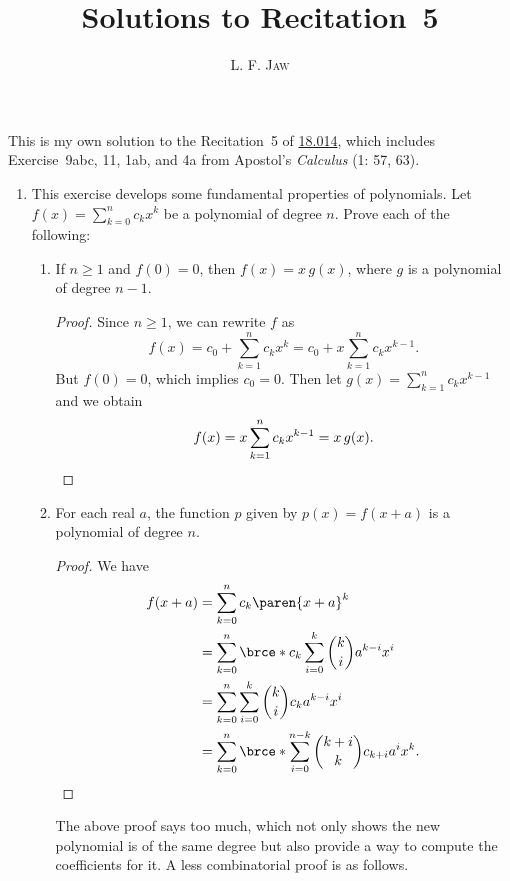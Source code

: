 \documentclass[a4paper]{article}
\title{Solutions to Recitation~5}
\author{L. F. \textsc{Jaw}}
\begin{document}
\maketitle

This is my own solution to the Recitation~5 of
\href{https://ocw.mit.edu/courses/mathematics/18-014-calculus-with-theory-fall-2010/recitations/}{18.014},
which includes Exercise~9abc, 11, 1ab, and 4a from Apostol's
\textit{Calculus} (1: 57, 63).

\begin{enumerate}
\item This exercise develops some fundamental properties of
  polynomials.  Let \(f(x) = \sum_{k=0}^n c_k x^k\) be a polynomial of
  degree \(n\).  Prove each of the following:
  \begin{enumerate}
  \item If \(n \ge 1\) and \(f(0) = 0\), then \(f(x) = x \, g(x)\), where
    \(g\) is a polynomial of degree \(n-1\).

    \begin{proof}
      Since \(n \ge 1\), we can rewrite \(f\) as
      \begin{displaymath}
        f(x) = c_0 + \sum_{k=1}^n c_k x^k = c_0 + x \sum_{k=1}^n c_k x^{k-1}.
      \end{displaymath}
      But \(f(0) = 0\), which implies \(c_0 = 0\).  Then let
      \(g(x) = \sum_{k=1}^n c_k x^{k-1}\) and we obtain
      \begin{displaymath}
        f(x) = x \sum_{k=1}^n c_k x^{k-1} = x \, g(x). \qedhere
      \end{displaymath}
    \end{proof}

  \item For each real \(a\), the function \(p\) given by
    \(p(x) = f(x+a)\) is a polynomial of degree \(n\).

    \begin{proof}
      We have
      \begin{align*}
        f(x+a) &= \sum_{k=0}^n c_k \paren{x+a}^k \\
               &= \sum_{k=0}^n \brce*{ c_k \sum_{i=0}^k \binom{k}{i} a^{k-i} x^i } \\
               &= \sum_{k=0}^n \sum_{i=0}^k \binom{k}{i} c_k a^{k-i} x^i \\
               &= \sum_{k=0}^n \brce*{ \sum_{i=0}^{n-k} \binom{k+i}{k} c_{k+i} a^{i} } x^k. \qedhere
      \end{align*}
    \end{proof}
    The above proof says too much, which not only shows the new
    polynomial is of the same degree but also provide a way to compute
    the coefficients for it.  A less combinatorial proof is as
    follows.


\end{enumerate}
\end{enumerate}
\end{document}
